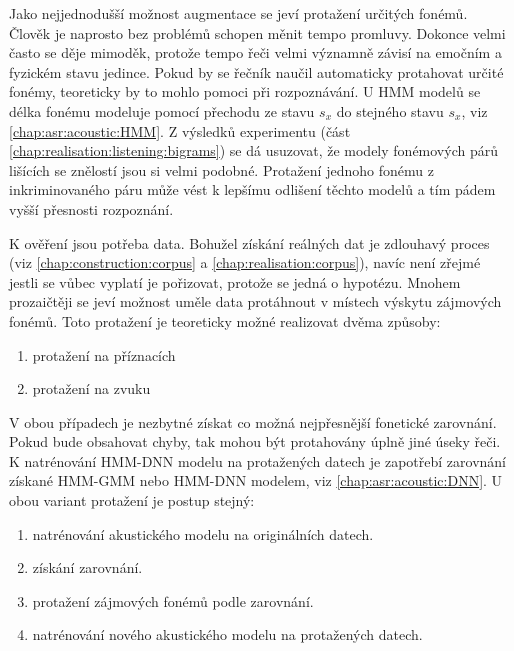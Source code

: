 Jako nejjednodušší možnost augmentace se jeví protažení určitých fonémů. Člověk je naprosto bez problémů schopen měnit tempo promluvy. Dokonce velmi často se děje mimoděk, protože tempo řeči velmi významně závisí na emočním a fyzickém stavu jedince. Pokud by se řečník naučil automaticky protahovat určité fonémy, teoreticky by to mohlo pomoci při rozpoznávání. U HMM modelů se délka fonému modeluje pomocí přechodu ze stavu $s_x$ do stejného stavu $s_x$, viz \ref{chap:asr:acoustic:HMM}. Z výsledků  experimentu (část \ref{chap:realisation:listening:bigrams}) se dá usuzovat, že modely fonémových párů lišících se znělostí jsou si velmi podobné. Protažení jednoho fonému z inkriminovaného páru může vést k lepšímu odlišení těchto modelů
a tím pádem vyšší přesnosti rozpoznání.

K ověření jsou potřeba data. Bohužel získání reálných dat je zdlouhavý proces (viz \ref{chap:construction:corpus} a \ref{chap:realisation:corpus}), navíc není zřejmé jestli se vůbec vyplatí je pořizovat, protože se jedná o hypotézu. Mnohem prozaičtěji se jeví možnost uměle data protáhnout v místech výskytu zájmových fonémů. Toto protažení je teoreticky možné realizovat dvěma způsoby:

\begin{enumerate}
  \item protažení na příznacích
  \item protažení na zvuku
\end{enumerate}

\noindent V obou případech je nezbytné získat co možná nejpřesnější fonetické zarovnání. Pokud bude obsahovat chyby, tak mohou být protahovány úplně jiné úseky řeči. K natrénování HMM-DNN modelu na protažených datech je zapotřebí zarovnání získané HMM-GMM nebo HMM-DNN modelem, viz \ref{chap:asr:acoustic:DNN}. U obou variant protažení je postup stejný:

\begin{enumerate}
  \item natrénování akustického modelu na originálních datech.
  \item získání zarovnání.
  \item protažení zájmových fonémů podle zarovnání.
  \item natrénování nového akustického modelu na protažených datech.
\end{enumerate}

